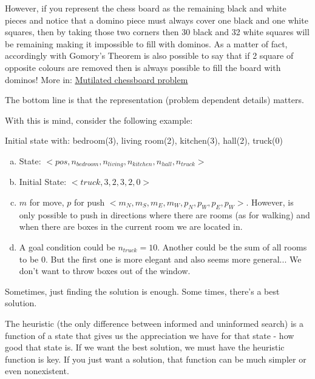 
However, if you represent the chess board as the remaining black and white pieces and notice that a domino piece must always cover one black and one white squares, then by taking those two corners then 30 black and 32 white squares will be remaining making it impossible to fill with dominos. As a matter of fact, accordingly with Gomory's Theorem is also possible to say that if 2 square of opposite colours are removed then is always possible to fill the board with dominos! More in: \href{https://en.wikipedia.org/wiki/Mutilated_chessboard_problem}{\ul{Mutilated chessboard problem}}

The bottom line is that the representation (problem dependent details) matters.


With this is mind, consider the following example:

Initial state with:
bedroom(3), living room(2), kitchen(3), hall(2), truck(0)



\begin{enumerate}[a)]
    \item State: $<pos, n_{bedroom}, n_{living}, n_{kitchen}, n_{hall}, n_{truck}>$
    \item Initial State: $<truck, 3,2,3,2,0>$
    \item $m$ for move, $p$ for push $<m_N, m_S, m_E, m_W, p_N, p_W, p_E, p_W >$. However, is only possible to push in directions where there are rooms (as for walking) and when there are boxes in the current room we are located in.
    \item A goal condition could be $n_{truck} = 10$. Another could be the sum of all rooms to be 0. But the first one is more elegant and also seems more general... We don't want to throw boxes out of the window.
\end{enumerate}






Sometimes, just finding the solution is enough. Some times, there's a best solution.


The heuristic (the only difference between informed and uninformed search) is a function of a state that gives us the appreciation we have for that state - how good that state is. If we want the best solution, we must have the heuristic function is key. If you just want a solution, that function can be much simpler or even nonexistent.







